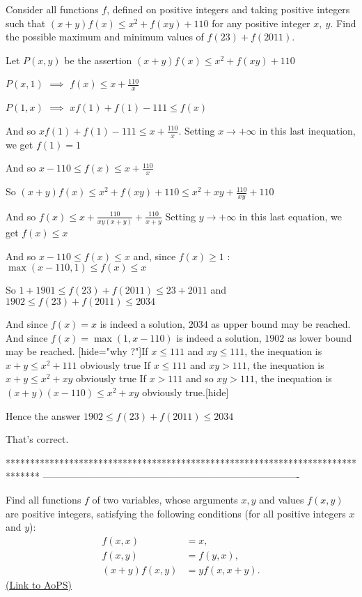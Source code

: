 \begin{solution}
	\begin{tcolorbox}Consider all functions $ f$, defined on positive integers and taking positive integers such that
$(x+y)f(x)\leq x^2+f(xy)+110$ for any positive integer $ x,\ y$.
Find the possible maximum and minimum values of $f(23)+f(2011)$.\end{tcolorbox}
Let $P(x,y)$ be the assertion $(x+y)f(x)\le x^2+f(xy)+110$

$P(x,1)$ $\implies$ $f(x)\le x+\frac{110}x$

$P(1,x)$ $\implies$ $xf(1)+f(1)-111\le f(x)$

And so $xf(1)+f(1)-111\le x+\frac{110}x$. 
Setting $x\to+\infty$ in this last inequation, we get $f(1)=1$

And so $x-110\le f(x)\le x+\frac{110}x$

So $(x+y)f(x)\le x^2+f(xy)+110\le x^2+xy+\frac{110}{xy}+110$

And so $f(x)\le x+\frac{110}{xy(x+y)}+\frac {110}{x+y}$ 
Setting $y\to +\infty$ in this last equation, we get $f(x)\le x$

And so $x-110\le f(x)\le x$ and, since $f(x)\ge 1$ : $\max(x-110,1)\le f(x)\le x$

So $1+1901\le f(23)+f(2011)\le 23+2011$ and $1902\le f(23)+f(2011)\le 2034$

And since $f(x)=x$ is indeed a solution, $2034$ as upper bound may be reached.
And since $f(x)=\max(1,x-110)$ is indeed a solution, $1902$ as lower bound may be reached.
[hide="why ?"]If $x\le 111$ and $xy\le 111$, the inequation is $x+y\le x^2+111$ obviously true
If $x\le 111$ and $xy>111$, the inequation is $x+y\le x^2+xy$ obviously true
If $x>111$ and so $xy>111$, the inequation is $(x+y)(x-110)\le x^2+xy$ obviously true.[\/hide]

Hence the answer $\boxed{1902\le f(23)+f(2011)\le 2034}$
\end{solution}



\begin{solution}
	That's correct.
\end{solution}
*******************************************************************************
-------------------------------------------------------------------------------

\begin{problem}
	Find all functions $f$ of two variables, whose arguments $x,y$ and values $f(x,y)$ are positive integers, satisfying the following conditions (for all positive integers $x$ and $y$):
\begin{align*} f(x,x)& =x,\\ f(x,y)& =f(y,x),\\ (x+y)f(x,y)& =yf(x,x+y).\end{align*}
	\flushright \href{https://artofproblemsolving.com/community/c6h385986}{(Link to AoPS)}
\end{problem}



